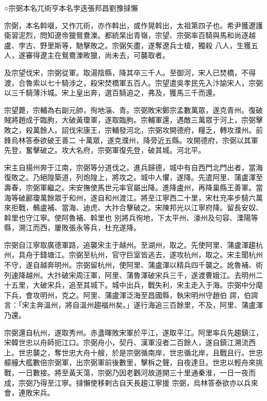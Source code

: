 
\begin{pinyinscope}

 ○宗弼本名兀術亨本名孛迭張邦昌劉豫撻懶



 宗弼，本名斡啜，又作兀術，亦作斡出，或作晃斡出，太祖第四子也。希尹獲遼護衛習泥烈，問知遼帝獵鴛鴦濼。都統杲出青嶺，宗望、宗弼率百騎與馬和尚逐越盧、孛古、野里斯等，馳擊敗之。宗弼矢盡，遂奪遼兵士槍，獨殺
 八人，生獲五人，遂審得遼主在鴛鴦濼畋獵，尚未去，可襲取者。



 及宗望伐宋，宗弼從軍。取湯陰縣，降其卒三千人。至御河，宋人已焚橋，不得渡，合魯索以七十騎涉之，殺宋焚橋軍五百人。宗望遣吳孝民先入汴諭宋人，宗弼以三千騎薄汴城。宋上皇出奔，選百騎追之，弗及，獲馬三千而還。



 宗望薨，宗輔為右副元帥，徇地淄、青。宗弼敗宋鄭宗孟數萬眾，遂克青州。復破賊將趙成于臨朐，大破黃瓊軍，遂取臨朐。宗輔軍還，遇敵三萬眾于河上，宗弼擊敗之，殺萬餘人。詔伐宋康王，宗輔發河北，宗弼攻開德府，糧乏，轉攻濮州。前鋒烏林答泰欲破王善二
 十萬眾，遂克濮州，降旁近五縣。攻開德府，宗弼以其軍先登，奮擊破之。攻大名府，宗弼軍復先登，破其城。河北平。



 宋主自揚州奔于江南，宗弼等分道伐之。進兵歸德，城中有自西門北門出者，當海復敗之。乃絕隍築道，列炮隍上，將攻之。城中人懼，遂降。先遣阿里、蒲盧渾至壽春，宗弼軍繼之。宋安撫使馬世元率官屬出降。進降盧州，再降巢縣王善軍。當海等破酈瓊萬餘眾于和州，遂自和州渡江。將至江寧西二十里，宋杜充率步騎六萬來拒戰，鶻盧補、當海、迪虎、大抃合擊破之。宋陳邦光以江寧府降。留長安奴、斡里也守江寧。使阿魯補、斡里也
 別將兵徇地，下太平州、濠州及句容、溧陽等縣，溯江而西，屢敗張永等兵，杜充遂降。



 宗弼自江寧取廣德軍路，追襲宋主于越州。至湖州，取之。先使阿里、蒲盧渾趨杭州，具舟于錢塘江。宗弼至杭州，官守巨室皆逃去，遂攻杭州，取之。宋主聞杭州不守，遂自越奔明州。宗弼留杭州，使阿里、蒲盧渾以精兵四千襲之。訛魯補、術列速降越州。大抃破宋周汪軍，阿里、蒲魯渾破宋兵三千，遂渡曹娥江。去明州二十五里，大破宋兵，追至其城下。城中出兵，戰失利，宋主走入于海。宗弼中分麾下兵，會攻明州，克之。阿里、蒲盧渾泛海至昌國縣，執宋明州守趙伯
 諤，伯諤言：「宋主奔溫州，將自溫州趨福州矣。」遂行海追三百餘里，不及，阿里、蒲盧渾乃還。



 宗弼還自杭州，遂取秀州。赤盞暉敗宋軍於平江，遂取平江。阿里率兵先趨鎮江，宋韓世忠以舟師扼江口。宗弼舟小，契丹、漢軍沒者二百餘人，遂自鎮江溯流西上。世忠襲之，奪世忠大舟十艘，於是宗弼循南岸，世忠循北岸，且戰且行。世忠艨艟大艦數倍宗弼軍，出宗弼軍前後數里，擊柝之聲，自夜達旦。世忠以輕舟來挑戰，一日數接。將至黃天蕩，宗弼乃因老鸛河故道開三十里通秦淮，一日一夜而成，宗弼乃得至江寧。撻懶使移剌古自天長趨江寧援
 宗弼，烏林答泰欲亦以兵來會，連敗宋兵。




\end{pinyinscope}
